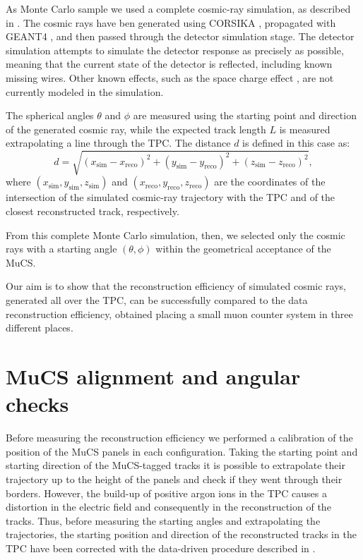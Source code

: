 \documentclass[a4paper]{scrartcl}
\begin{document}
As Monte Carlo sample we used a complete cosmic-ray simulation, as described in \cite{cosmic}. The cosmic rays have ben generated using CORSIKA \cite{corsika},  propagated with GEANT4 \cite{geant}, and then passed through the detector simulation stage. The detector simulation attempts to simulate the detector response as precisely as possible, meaning that the current state of the detector is reflected, including known missing wires. Other known effects, such as the space charge effect \cite{sce}, are not currently modeled in the simulation.

The spherical angles $\theta$ and $\phi$ are measured using the starting point and direction of the generated cosmic ray, while the expected track length $L$ is measured extrapolating a line through the TPC.
The distance $d$ is defined in this case as:
\begin{equation}\label{eq:d_mc}
d = \sqrt{(x_{\mathrm{sim}}-x_{\mathrm{reco}})^2+(y_{\mathrm{sim}}-y_{\mathrm{reco}})^2+(z_{\mathrm{sim}}-z_{\mathrm{reco}})^2},
\end{equation}
where $(x_{\mathrm{sim}},y_{\mathrm{sim}},z_{\mathrm{sim}})$ and $(x_{\mathrm{reco}},y_{\mathrm{reco}},z_{\mathrm{reco}})$ are the coordinates of the intersection of the simulated cosmic-ray trajectory with the TPC and of the closest reconstructed track, respectively.



From this complete Monte Carlo simulation, then, we selected only the cosmic rays with a starting angle $(\theta,\phi)$ within the geometrical acceptance of the MuCS.

Our aim is to show that the reconstruction efficiency of simulated cosmic rays, generated all over the TPC, can be successfully compared to the data reconstruction efficiency, obtained placing a small muon counter system in three different places.

\section{MuCS alignment and angular checks}\label{sec:flux}
Before measuring the reconstruction efficiency we performed a calibration of the position of the MuCS panels in each configuration. Taking the starting point and starting direction of the MuCS-tagged tracks it is possible to extrapolate their trajectory up to the height of the panels and check if they went through their borders. However, the build-up of positive argon ions in the TPC causes a distortion in the electric field and consequently in the reconstruction of the tracks. Thus, before measuring the starting angles and extrapolating the trajectories, the starting position and direction of the reconstructed tracks in the TPC have been corrected with the data-driven procedure described in \cite{sce}.
\end{document}
